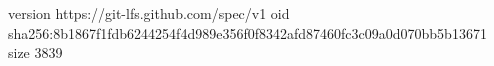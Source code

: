 version https://git-lfs.github.com/spec/v1
oid sha256:8b1867f1fdb6244254f4d989e356f0f8342afd87460fc3c09a0d070bb5b13671
size 3839
